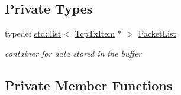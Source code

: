 \subsection*{Private Types}
\begin{DoxyCompactItemize}
\item 
typedef \hyperlink{openflow-interface_8h_afd9bcfa176617760671b67580f536fa7}{std\+::list}$<$ \hyperlink{classns3_1_1TcpTxItem}{Tcp\+Tx\+Item} $\ast$ $>$ \hyperlink{classns3_1_1TcpTxBuffer_a4abe4f4a277dc558fb81c87ca71d5982}{Packet\+List}
\begin{DoxyCompactList}\small\item\em container for data stored in the buffer \end{DoxyCompactList}\end{DoxyCompactItemize}
\subsection*{Private Member Functions}
